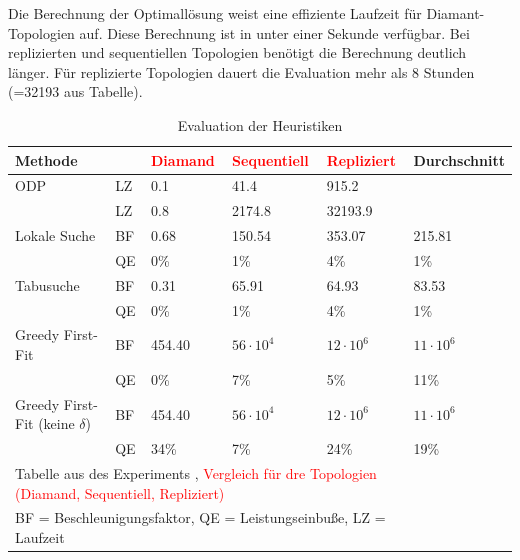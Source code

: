 \documentclass{article}
\begin{document}
Die Berechnung der Optimallösung weist eine effiziente Laufzeit für Diamant-Topologien auf. 
Diese Berechnung ist in unter einer Sekunde verfügbar. Bei replizierten und sequentiellen Topologien benötigt die Berechnung deutlich länger. 
Für replizierte Topologien dauert die Evaluation mehr als 8 Stunden (=32193 aus Tabelle). \\
\begin{table}[htbp]  
    \centering
    \caption{Evaluation der Heuristiken}
    \begin{tabular}{llllll}
    \toprule
    Methode                          &       & \textcolor{red}{Diamand}        & \textcolor{red}{Sequentiell}            & \textcolor{red}{Repliziert}                & Durchschnitt       \\
    \midrule
    ODP                              &LZ     &  0.1      & 41.4             & 915.2            &                  \\
                                     &LZ     &  0.8      & 2174.8           & 32193.9          &                  \\
    \cmidrule{1-5}
    Lokale Suche                     &BF     &  0.68     & 150.54           & 353.07           & 215.81           \\
                                     &QE     &0\%        & 1\%              &4\%               & 1\%              \\
    Tabusuche                       &BF      &  0.31     & 65.91            & 64.93            & 83.53            \\
                                     &QE     &0\%        & 1\%              &4\%               & 1\%              \\           
    Greedy First-Fit                 &BF     &  454.40   & $56 \cdot 10^4$  & $12 \cdot 10^6$  & $11 \cdot 10^6$  \\
                                     &QE     &0\%        & 7\%              &5\%               &11\%              \\
    Greedy First-Fit (keine $\delta$)&BF     &  454.40   & $56 \cdot 10^4$  & $12 \cdot 10^6$  & $11 \cdot 10^6$  \\
                                     &QE     &34\%       & 7\%              &24\%              & 19\%             \\
    \bottomrule
    \multicolumn{5}{l}{\footnotesize Tabelle aus des Experiments \cite{efficient-operator-placement}, \textcolor{red}{Vergleich für dre Topologien (Diamand, Sequentiell, Repliziert)}}\\
    \multicolumn{5}{l}{\footnotesize BF = Beschleunigungsfaktor, QE = Leistungseinbuße, LZ = Laufzeit}\\
    \end{tabular}
    \label{experiment-tabelle}
\end{table} 
\end{document}
